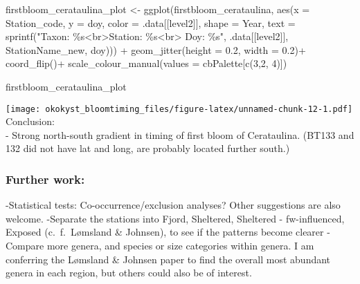 \documentclass[
]{article}
\newenvironment{Shaded}{\begin{snugshade}}{\end{snugshade}}
\newcommand{\AttributeTok}[1]{\textcolor[rgb]{0.77,0.63,0.00}{#1}}
\newcommand{\DecValTok}[1]{\textcolor[rgb]{0.00,0.00,0.81}{#1}}
\newcommand{\FloatTok}[1]{\textcolor[rgb]{0.00,0.00,0.81}{#1}}
\newcommand{\FunctionTok}[1]{\textcolor[rgb]{0.00,0.00,0.00}{#1}}
\newcommand{\NormalTok}[1]{#1}
\newcommand{\OtherTok}[1]{\textcolor[rgb]{0.56,0.35,0.01}{#1}}
\newcommand{\SpecialCharTok}[1]{\textcolor[rgb]{0.00,0.00,0.00}{#1}}
\newcommand{\StringTok}[1]{\textcolor[rgb]{0.31,0.60,0.02}{#1}}
\begin{document}
\begin{Shaded}
\begin{Highlighting}[]
\NormalTok{firstbloom\_cerataulina\_plot }\OtherTok{\textless{}{-}} \FunctionTok{ggplot}\NormalTok{(firstbloom\_cerataulina, }\FunctionTok{aes}\NormalTok{(}\AttributeTok{x =}\NormalTok{ Station\_code, }\AttributeTok{y =}\NormalTok{ doy, }\AttributeTok{color =}\NormalTok{ .data[[level2]], }\AttributeTok{shape =}\NormalTok{ Year, }
                       \AttributeTok{text =} \FunctionTok{sprintf}\NormalTok{(}\StringTok{"Taxon: \%s\textless{}br\textgreater{}Station: \%s\textless{}br\textgreater{} Doy: \%s"}\NormalTok{, .data[[level2]], StationName\_new, doy))) }\SpecialCharTok{+}
  \FunctionTok{geom\_jitter}\NormalTok{(}\AttributeTok{height =} \FloatTok{0.2}\NormalTok{, }\AttributeTok{width =} \FloatTok{0.2}\NormalTok{)}\SpecialCharTok{+}
  \FunctionTok{coord\_flip}\NormalTok{()}\SpecialCharTok{+}
  \FunctionTok{scale\_colour\_manual}\NormalTok{(}\AttributeTok{values =}\NormalTok{ cbPalette[}\FunctionTok{c}\NormalTok{(}\DecValTok{3}\NormalTok{,}\DecValTok{2}\NormalTok{, }\DecValTok{4}\NormalTok{)])}

\NormalTok{firstbloom\_cerataulina\_plot}
\end{Highlighting}
\end{Shaded}

\texttt{[image: okokyst\_bloomtiming\_files/figure-latex/unnamed-chunk-12-1.pdf]}
Conclusion:\\
- Strong north-south gradient in timing of first bloom of Cerataulina.
(BT133 and 132 did not have lat and long, are probably located further
south.)

\hypertarget{further-work}{%
\subsubsection{Further work:}\label{further-work}}

-Statistical tests: Co-occurrence/exclusion analyses? Other suggestions
are also welcome. -Separate the stations into Fjord, Sheltered,
Sheltered - fw-influenced, Exposed (c.~f.~Lømsland \& Johnsen), to see
if the patterns become clearer -Compare more genera, and species or size
categories within genera. I am conferring the Lømsland \& Johnsen paper
to find the overall most abundant genera in each region, but others
could also be of interest.
\end{document}
